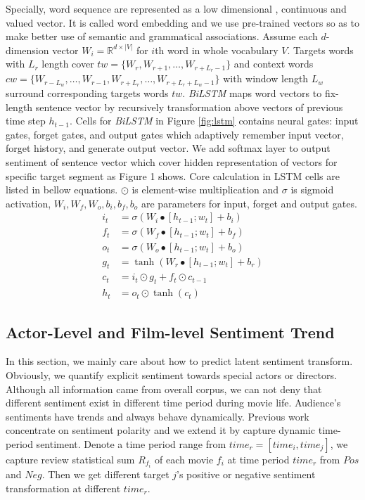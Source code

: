 \par Specially, word sequence are represented as a low dimensional , continuous and valued vector. It is called word embedding and we use pre-trained vectors so as to make better use of semantic and grammatical associations. Assume each $d$-dimension vector $ W_i = \mathbb{R}^{d \times |V|}$ for $i$th word in whole vocabulary $V$. Targets words with $L_r$ length cover $tw = \{W_r, W_{r+1}, \dots, W_{r+L_r-1}\}$ and context words $cw = \{W_{r-L_w}, \dots, W_{r-1}, W_{r+L_r}, \dots, W_{r+L_r+L_w-1}\}$ with window length $L_w$ surround corresponding targets words $tw$. \emph{BiLSTM} maps word vectors to fix-length sentence vector by recursively transformation above vectors of previous time step $h_{t-1}$. Cells for \emph{BiLSTM} in Figure \ref{fig:lstm} contains neural gates: input gates, forget gates, and output gates which adaptively remember input vector, forget history, and generate output vector. We add softmax layer to output sentiment of sentence vector which cover hidden representation of vectors for specific target segment as Figure 1 shows. Core calculation in LSTM cells are listed in bellow equations. \cite{} $\odot$ is element-wise multiplication and $\sigma$ is sigmoid activation, $W_i, W_f, W_o, b_i, b_f, b_o$ are parameters for input, forget and output gates.
\begin{subequations}
\begin{align}
  i_t &= \sigma(W_i \bullet [h_{t-1};w_t] + b_i)\\
  f_t &= \sigma(W_f \bullet [h_{t-1};w_t] + b_f)\\
  o_t &= \sigma(W_o \bullet [h_{t-1};w_t] + b_o)\\
  g_t &= \tanh(W_r \bullet [h_{t-1};w_t] + b_r)\\
  c_t &= i_t \odot g_t + f_t \odot c_{t-1}\\
  h_t &= o_t \odot \tanh(c_t)
\end{align}
\end{subequations}


\subsection{Actor-Level and Film-level Sentiment Trend}
\par In this section, we mainly care about how to predict latent sentiment transform. Obviously, we quantify explicit sentiment towards special actors or directors. Although all information came from overall corpus, we can not deny that different sentiment exist in different time period during movie life. Audience's sentiments have trends and always behave dynamically. Previous work concentrate on sentiment polarity and we extend it by capture dynamic time-period sentiment. Denote a time period range from $time_r = [time_i, time_j]$, we capture review statistical sum $R_{f_i}$ of each movie $f_i$ at time period $time_r$ from $Pos$ and $Neg$. Then we get different target $j$'s positive or negative sentiment transformation at different $time_r$.

